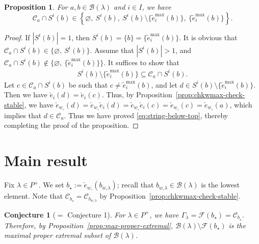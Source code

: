 \documentclass[reqno]{amsart}
\newtheorem{proposition}[theorem]{Proposition}
\newtheorem{conjecture}[theorem]{Conjecture}
\theoremstyle{definition}
\theoremstyle{remark}
\numberwithin{equation}{section}
\newcommand{\B}{\mathcal{B}}
\newcommand{\F}{\mathcal{F}}
\newcommand{\Gl}{\Gamma_\lambda}
\newcommand{\wo}{w_\circ}
\newcommand{\te}{\tilde e}
\newcommand{\chke}{\check e}
\newcommand{\bstar}{b_\star}
\newcommand{\Bl}{\B(\lambda)}
\begin{document}
	
	\begin{proposition}\label{prop:weak-string-property}
		For $a,b\in\Bl$ and $i\in I$, we have
		\[
		\mathcal{C}_a\cap S^i(b)\in\left\{\varnothing,\ S^i(b),\
		S^i(b)\setminus\{\te_i^{\max}(b)\},\ \{\te_i^{\max}(b)\}\right\}.
		\]
	\end{proposition}
	\begin{proof}
		If $|S^i(b)|=1$, then $S^i(b)=\{b\}=\{\te_i^{\max}(b)\}$.
		It is obvious that
		$\mathcal{C}_a\cap S^i(b)\in\{\varnothing,\ S^i(b)\}$.
		Assume that $|S^i(b)|>1$,
		and $\mathcal{C}_a\cap S^i(b)\notin\{\varnothing,\ \{\te_i^{\max}(b)\}\}$.
		It suffices to show that 
		\begin{align}\label{eq:string-below-top}
			S^i(b)\setminus\{\te_i^{\max}(b)\}\subseteq\mathcal{C}_a\cap S^i(b).
		\end{align}
		Let $c\in \mathcal{C}_a\cap S^i(b)$ be such that $c\ne\te_i^{\max}(b)$,
		and let $d\in S^i(b)\setminus\{\te_i^{\max}(b)\}$.
		Then we have $\chke_{i}(d)=\chke_{i}(c)$.
		Thus, by Proposition~\ref{prop:chkwmax-check-stable},
		we have $\chke_{w_\circ}(d)=\chke_{w_\circ}\chke_{i}(d)=\chke_{w_\circ}\chke_{i}(c)=\chke_{w_\circ}(c)=\chke_{w_\circ}(a)$,
		which implies that $d\in\mathcal{C}_a$.
		Thus we have proved \eqref{eq:string-below-top},
		thereby completing the proof of the proposition.
	\end{proof}
	
	\section{Main result}\label{sec:main-theorems}
	Fix $\lambda\in P^+$.
	We set $\bstar:=\chke_{\wo}(b_{\wo\lambda})$;
	recall that $b_{\wo\lambda}\in\Bl$ is the lowest element.
	Note that $\mathcal{C}_{b_{\star}}=\mathcal{C}_{b_{\wo\lambda}}$ by Proposition~\ref{prop:chkwmax-check-stable}.
	
	\begin{conjecture}[$=$ Conjecture 1]\label{conj:main1-all-types}
		For $\lambda\in P^+$, we have
		$
		\Gl=\F(\bstar)=\mathcal{C}_{b_{\star}}.
		$
		Therefore, by Proposition~\ref{prop:max-proper-extremal}, $\Bl\setminus\F(\bstar)$ is the maximal proper extremal subset
		of $\Bl$.
	\end{conjecture}
	
\end{document}
